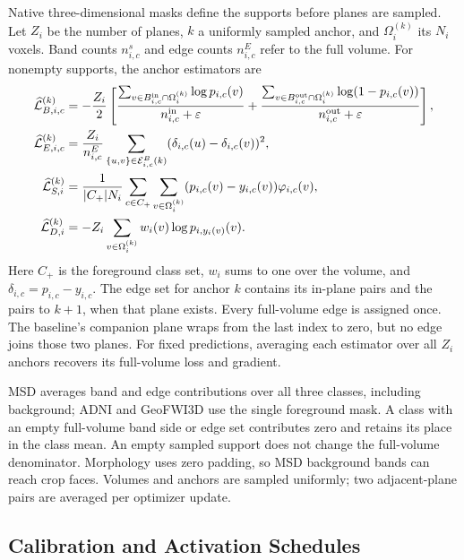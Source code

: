 \documentclass[12pt,a4paper]{article}
\begin{document}
Native three-dimensional masks define the supports before planes are
sampled. Let $Z_i$ be the number of planes, $k$ a uniformly sampled
anchor, and $\Omega_i^{(k)}$ its $N_i$ voxels. Band counts $n_{i,c}^s$
and edge counts $n_{i,c}^E$ refer to the full volume. For nonempty
supports, the anchor estimators are
\begin{align}
\widehat{\mathcal L}_{B,i,c}^{(k)}
 &=-\frac{Z_i}{2}\left[
 \frac{\sum_{v\in B_{i,c}^{\rm in}\cap\Omega_i^{(k)}}\log p_{i,c}(v)}{n_{i,c}^{\rm in}+\varepsilon}
 +\frac{\sum_{v\in B_{i,c}^{\rm out}\cap\Omega_i^{(k)}}\log(1-p_{i,c}(v))}{n_{i,c}^{\rm out}+\varepsilon}
 \right],\label{eq:medsam-sampled-band-loss}\\
\widehat{\mathcal L}_{E,i,c}^{(k)}
 &=\frac{Z_i}{n_{i,c}^E}\sum_{\{u,v\}\in\mathcal E_{i,c}^B(k)}
 (\delta_{i,c}(u)-\delta_{i,c}(v))^2,\label{eq:medsam-sampled-edge-loss}\\
\widehat{\mathcal L}_{S,i}^{(k)}
 &=\frac{1}{|C_+|N_i}\sum_{c\in C_+}\sum_{v\in\Omega_i^{(k)}}
 (p_{i,c}(v)-y_{i,c}(v))\varphi_{i,c}(v),\label{eq:medsam-sampled-sdf}\\
\widehat{\mathcal L}_{D,i}^{(k)}
 &=-Z_i\sum_{v\in\Omega_i^{(k)}}w_i(v)\log p_{i,y_i(v)}(v).
 \label{eq:medsam-sampled-depth}
\end{align}
Here $C_+$ is the foreground class set, $w_i$ sums to one over the
volume, and $\delta_{i,c}=p_{i,c}-y_{i,c}$. The edge set for anchor $k$
contains its in-plane pairs and the pairs to $k+1$, when that plane
exists. Every full-volume edge is assigned once. The baseline's
companion plane wraps from the last index to zero, but no edge joins
those two planes. For fixed predictions, averaging each estimator over
all $Z_i$ anchors recovers its full-volume loss and gradient.

MSD averages band and edge contributions over all three classes,
including background; ADNI and GeoFWI3D use the single foreground
mask. A class with an empty full-volume band side or edge set contributes
zero and retains its place in the class mean. An empty sampled support
does not change the full-volume denominator. Morphology uses zero
padding, so MSD background bands can reach crop faces. Volumes and
anchors are sampled uniformly; two adjacent-plane pairs are averaged
per optimizer update.

\subsection{Calibration and Activation Schedules}
\label{sec:detailed-calibration}\label{sec:calibration-methods}
\end{document}
